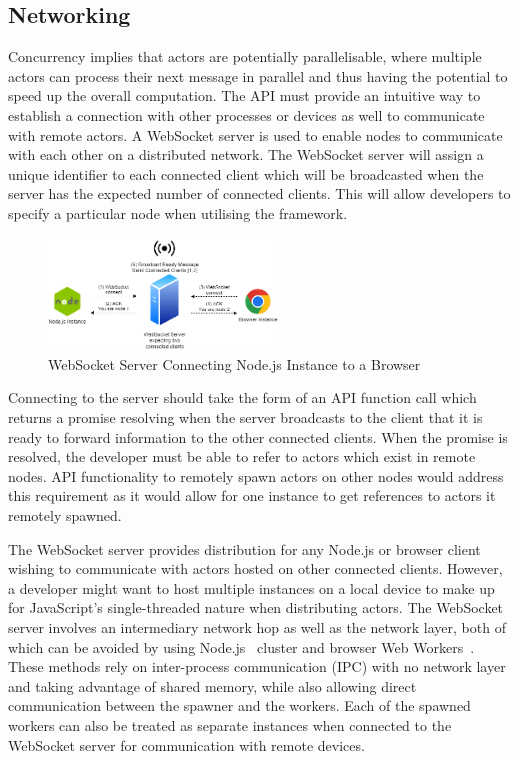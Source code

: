 \documentclass[lettersize,journal]{IEEEtran}
\begin{document}
\subsection{Networking}
Concurrency implies that actors are potentially parallelisable, where multiple actors can process their next message in parallel and thus having the potential to speed up the overall computation. The API must provide an intuitive way to establish a connection with other processes or devices as well to communicate with remote actors. A WebSocket server is used to enable nodes to communicate with each other on a distributed network. The WebSocket server will assign a unique identifier to each connected client which will be broadcasted when the server has the expected number of connected clients. This will allow developers to specify a particular node when utilising the framework.

\begin{figure}[H]
    \begin{centering}
        \includegraphics[width=230px]{resources/websocketconnection.png}
        \caption{WebSocket Server Connecting Node.js Instance to a Browser}
    \end{centering}
\end{figure}

Connecting to the server should take the form of an API function call which returns a promise resolving when the server broadcasts to the client that it is ready to forward information to the other connected clients. When the promise is resolved, the developer must be able to refer to actors which exist in remote nodes. API functionality to remotely spawn actors on other nodes would address this requirement as it would allow for one instance to get references to actors it remotely spawned.

The WebSocket server provides distribution for any Node.js or browser client wishing to communicate with actors hosted on other connected clients. However, a developer might want to host multiple instances on a local device to make up for JavaScript's single-threaded nature when distributing actors. The WebSocket server involves an intermediary network hop as well as the network layer, both of which can be avoided by using Node.js~\cite{nodejs} cluster and browser Web Workers~\cite{webworkers}. These methods rely on inter-process communication (IPC) with no network layer and taking advantage of shared memory, while also allowing direct communication between the spawner and the workers. Each of the spawned workers can also be treated as separate instances when connected to the WebSocket server for communication with remote devices.
\end{document}

